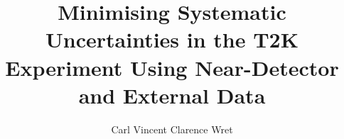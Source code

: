 \documentclass[hyperpdf,bindnopdf,alphafoot]{hepthesis}
\title{Minimising Systematic Uncertainties in the T2K Experiment Using Near-Detector and External Data}
\author{Carl Vincent Clarence Wret}
\begin{document}
\begin{frontmatter}
  
\end{frontmatter}

% 
% 
% 
% 
\begin{mainmatter}
  
  
  
  
  
  
  
  
  
  
  
  
\end{mainmatter}

\begin{appendices}
	
	
	
	
	
	
	
	
\end{appendices}

\begin{backmatter}
  
\end{backmatter}

\end{document}
